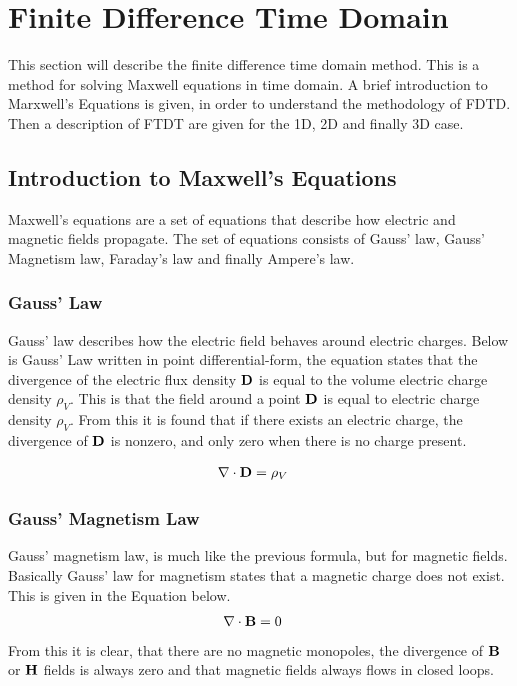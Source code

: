 \section{Finite Difference Time Domain}
\label{sec:fdtd}
This section will describe the finite difference time domain method. This is a method for solving Maxwell equations in time domain. A brief introduction to Marxwell's Equations is given, in order to understand the methodology of FDTD. Then a description of FTDT are given for the 1D, 2D and finally 3D case. 

\subsection{Introduction to Maxwell's Equations}
Maxwell's equations are a set of equations that describe how electric and magnetic fields propagate. The set of equations consists of Gauss' law, Gauss' Magnetism law, Faraday's law and finally Ampere's law. 

\subsubsection{Gauss' Law}
Gauss' law describes how the electric field behaves around electric charges. Below is Gauss' Law written in point differential-form, the equation states that the divergence of the electric flux density $\bold{D}$ is equal to the volume electric charge density $\rho_V$. This is that the field around a point $\bold{D}$ is equal to electric charge density $\rho_V$. From this it is found that if there exists an electric charge, the divergence of $\bold{D}$ is nonzero, and only zero when there is no charge present. 

\begin{align}
\nabla \cdot \bold{D} &= \rho_V
\end{align}

\subsubsection{Gauss' Magnetism Law}
Gauss' magnetism law, is much like the previous formula, but for magnetic fields. Basically Gauss' law for magnetism states that a magnetic charge does not exist. This is given in the Equation below. 
\begin{align}
\nabla \cdot \bold{B} &=0
\end{align}
From this it is clear, that there are no magnetic monopoles, the divergence of $\bold{B}$ or $\bold{H}$ fields is always zero and that magnetic fields always flows in closed loops. 


